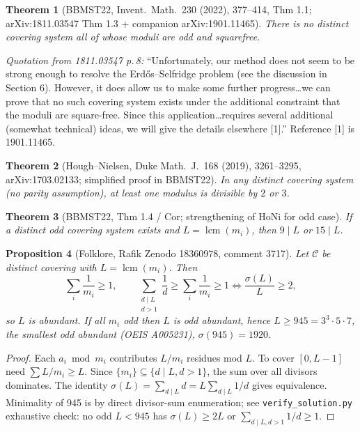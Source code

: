 \documentclass[11pt,a4paper]{article}
\theoremstyle{plain}
\newtheorem{theorem}{Theorem}[section]
\newtheorem{proposition}[theorem]{Proposition}
\theoremstyle{definition}
\theoremstyle{remark}
\begin{document}
\begin{theorem}[BBMST22, Invent.\ Math.\ 230 (2022), 377--414, Thm 1.1; arXiv:1811.03547 Thm 1.3 + companion arXiv:1901.11465]\label{thm:BBMST-SF}
There is no distinct covering system all of whose moduli are odd and squarefree.
\end{theorem}
\noindent\textit{Quotation from 1811.03547 p.\,8:} ``Unfortunately, our method does not seem to be strong enough to resolve the Erd\H{o}s--Selfridge problem (see the discussion in Section 6). However, it does allow us to make some further progress\dots we can prove that no such covering system exists under the additional constraint that the moduli are square-free. Since this application\dots requires several additional (somewhat technical) ideas, we will give the details elsewhere [1].'' Reference [1] is 1901.11465.

\begin{theorem}[Hough--Nielsen, Duke Math.\ J.\ 168 (2019), 3261--3295, arXiv:1703.02133; simplified proof in BBMST22]\label{thm:HoNi}
In any distinct covering system (no parity assumption), at least one modulus is divisible by $2$ or $3$.
\end{theorem}

\begin{theorem}[BBMST22, Thm 1.4 / Cor; strengthening of HoNi for odd case]\label{thm:BBMST-9or15}
If a distinct odd covering system exists and $L=\operatorname{lcm}(m_{i})$, then $9\mid L$ or $15\mid L$.
\end{theorem}

\begin{proposition}[Folklore, Rafik Zenodo 18360978, comment 3717]\label{prop:abundant}
Let $\mathcal C$ be distinct covering with $L=\operatorname{lcm}(m_{i})$. Then
\[
\sum_{i}\frac1{m_{i}}\ge1,\qquad
\sum_{\substack{d\mid L\\ d>1}}\frac1d\ge\sum_{i}\frac1{m_{i}}\ge1\iff\frac{\sigma(L)}{L}\ge2,
\]
so $L$ is abundant. If all $m_{i}$ odd then $L$ is odd abundant, hence $L\ge945=3^{3}\cdot5\cdot7$, the smallest odd abundant (OEIS A005231), $\sigma(945)=1920$.
\end{proposition}
\begin{proof}
Each $a_{i}\bmod m_{i}$ contributes $L/m_{i}$ residues mod $L$. To cover $[0,L-1]$ need $\sum L/m_{i}\ge L$. Since $\{m_{i}\}\subseteq\{d\mid L,d>1\}$, the sum over all divisors dominates. The identity $\sigma(L)=\sum_{d\mid L}d=L\sum_{d\mid L}1/d$ gives equivalence. Minimality of 945 is by direct divisor-sum enumeration; see \texttt{verify\_solution.py} exhaustive check: no odd $L<945$ has $\sigma(L)\ge2L$ or $\sum_{d\mid L,d>1}1/d\ge1$.
\end{proof}
\end{document}
